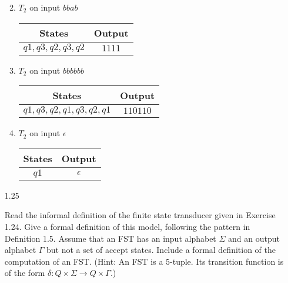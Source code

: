 \begin{enumerate}
\begin{enumerate}
\begin{table}[H]
                    \end{table}
              \item $T_2$ on input $bbab$
                    \begin{table}[H]
                        \centering
                        \begin{tabular}{|c|c|}
                            \hline
                            States           & Output \\
                            \hline
                            $q1,q3,q2,q3,q2$ & $1111$ \\
                            \hline
                        \end{tabular}
                    \end{table}
              \item $T_2$ on input $bbbbbb$
                    \begin{table}[H]
                        \centering
                        \begin{tabular}{|c|c|}
                            \hline
                            States                 & Output   \\
                            \hline
                            $q1,q3,q2,q1,q3,q2,q1$ & $110110$ \\
                            \hline
                        \end{tabular}
                    \end{table}
              \item $T_2$ on input $\epsilon$
                    \begin{table}[H]
                        \centering
                        \begin{tabular}{|c|c|}
                            \hline
                            States & Output     \\
                            \hline
                            $q1$   & $\epsilon$ \\
                            \hline
                        \end{tabular}
                    \end{table}
          \end{enumerate}
          
    \item [1.25]
          
          Read the informal definition of the finite state transducer given in Exercise 1.24. Give a formal definition of this model, following the pattern in Definition 1.5. Assume that an FST has an input alphabet $\Sigma$ and an output alphabet $\Gamma$ but not a set of accept states. Include a formal definition of the computation of an FST. (Hint: An FST is a 5-tuple. Its transition function is of the form $\delta: Q \times \Sigma \longrightarrow Q \times \Gamma$.)


\end{enumerate}
